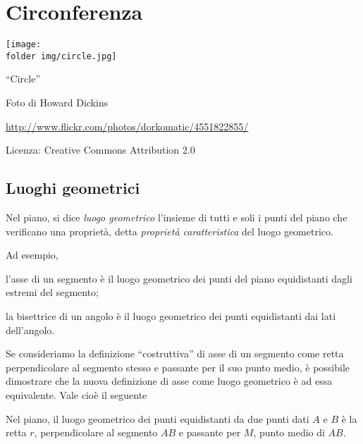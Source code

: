 
\chapter{Circonferenza}\label{chap:circonferenza}

\texttt{[image: \\folder img/circle.jpg]}
  \begin{center}
    {\large ``Circle''}\par
    Foto di Howard Dickins\par
    \url{http://www.flickr.com/photos/dorkomatic/4551822855/}\par
    Licenza: Creative Commons Attribution 2.0\par
  \end{center}
\newpage

\section{Luoghi geometrici}\label{sect:luoghi_geometrici}

\begin{definizione}
Nel piano, si dice \emph{luogo geometrico} l'insieme di tutti e soli 
i punti del piano che verificano una proprietà, detta \emph{proprietà 
caratteristica} del luogo geometrico.
\end{definizione}
Ad esempio,
\begin{itemize*}
\item l'asse di un segmento è il luogo geometrico dei punti del piano 
equidistanti dagli estremi del segmento;
\item la bisettrice di un angolo è il luogo geometrico dei punti 
equidistanti dai lati dell'angolo.
\end{itemize*}
Se consideriamo la definizione ``costruttiva'' di asse di un segmento 
come retta perpendicolare al segmento stesso e passante per il suo 
punto medio, è possibile dimostrare che la nuova definizione di asse 
come luogo geometrico è ad essa equivalente.
Vale cioè il seguente
\begin{teorema}
Nel piano, il luogo geometrico dei punti equidistanti da due punti 
dati \(A\) e \(B\) è la retta \(r\), perpendicolare al segmento \(AB\) e 
passante per \(M\), punto medio di \(AB\).
\end{teorema}

